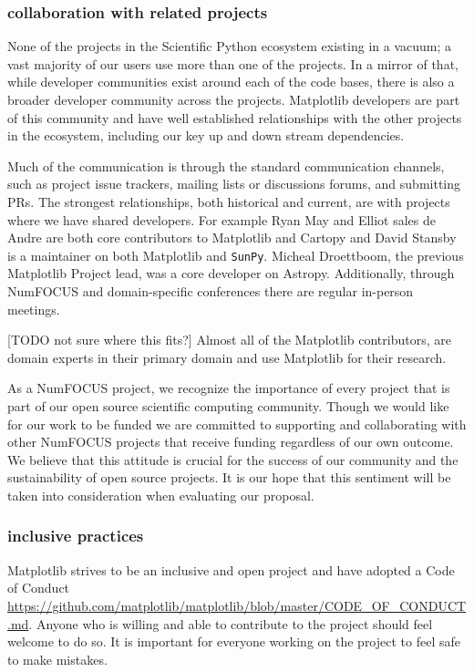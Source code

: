\documentclass[12pt]{article}
\numberwithin{page}{section}
\begin{document}
\subsubsection{collaboration with related projects}

None of the projects in the Scientific Python ecosystem existing in a
vacuum; a vast majority of our users use more than one of the
projects.  In a mirror of that, while developer communities exist
around each of the code bases, there is also a broader developer
community across the projects.  Matplotlib developers are part of this
community and have well established relationships with the other
projects in the ecosystem, including our key up and down stream
dependencies.

Much of the communication is through the standard communication
channels, such as project issue trackers, mailing lists or discussions
forums, and submitting PRs.  The strongest relationships, both
historical and current, are with projects where we have shared
developers.  For example Ryan May and Elliot sales de Andre are both
core contributors to Matplotlib and Cartopy and David Stansby is a
maintainer on both Matplotlib and \texttt{SunPy}.  Micheal Droettboom,
the previous Matplotlib Project lead, was a core developer on Astropy.
Additionally, through NumFOCUS and domain-specific conferences there
are regular in-person meetings.

[TODO not sure where this fits?] Almost all of the Matplotlib
contributors, are domain experts in their primary domain and use
Matplotlib for their research.


As a NumFOCUS project, we recognize the importance of every project
that is part of our open source scientific computing community. Though
we would like for our work to be funded we are committed to supporting
and collaborating with other NumFOCUS projects that receive funding
regardless of our own outcome. We believe that this attitude is
crucial for the success of our community and the sustainability of
open source projects. It is our hope that this sentiment will be taken
into consideration when evaluating our proposal.


\subsubsection{inclusive practices}

Matplotlib strives to be an inclusive and open project and have
adopted a Code of Conduct
\url{https://github.com/matplotlib/matplotlib/blob/master/CODE_OF_CONDUCT.md}.
Anyone who is willing and able to contribute to the project should feel
welcome to do so.  It is important for everyone working on the project
to feel safe to make mistakes.
\end{document}
